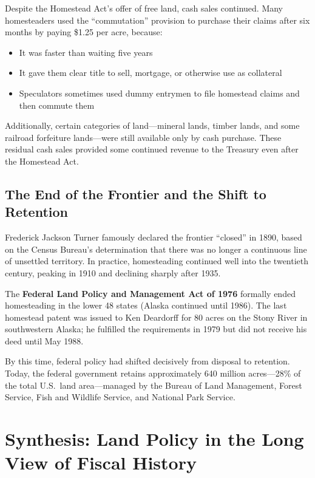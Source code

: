 \documentclass[12pt]{article}
\begin{document}
Despite the Homestead Act's offer of free land, cash sales continued.  Many homesteaders used the ``commutation'' provision to purchase their claims after six months by paying \$1.25 per acre, because:

\begin{itemize}
\item It was faster than waiting five years
\item It gave them clear title to sell, mortgage, or otherwise use as collateral
\item Speculators sometimes used dummy entrymen to file homestead claims and then commute them
\end{itemize}

Additionally, certain categories of land---mineral lands, timber lands, and some railroad forfeiture lands---were still available only by cash purchase.  These residual cash sales provided some continued revenue to the Treasury even after the Homestead Act.

\subsection{The End of the Frontier and the Shift to Retention}

Frederick Jackson Turner famously declared the frontier ``closed'' in 1890, based on the Census Bureau's determination that there was no longer a continuous line of unsettled territory.  In practice, homesteading continued well into the twentieth century, peaking in 1910 and declining sharply after 1935.

The \textbf{Federal Land Policy and Management Act of 1976} formally ended homesteading in the lower 48 states (Alaska continued until 1986).  The last homestead patent was issued to Ken Deardorff for 80 acres on the Stony River in southwestern Alaska; he fulfilled the requirements in 1979 but did not receive his deed until May 1988.

By this time, federal policy had shifted decisively from disposal to retention.  Today, the federal government retains approximately 640 million acres---28\% of the total U.S.\ land area---managed by the Bureau of Land Management, Forest Service, Fish and Wildlife Service, and National Park Service.


\section{Synthesis: Land Policy in the Long View of Fiscal History}\label{sec:conclusion}
\end{document}
